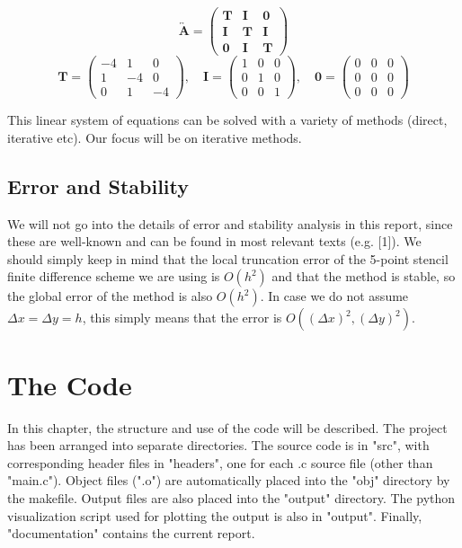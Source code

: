 \documentclass[11pt]{report}
\begin{document}
\begin{equation}
\overleftrightarrow{\textbf{A}} = 
\begin{pmatrix}
\bm{T} & \bm{I} & \bm{0} \\
\bm{I} & \bm{T} & \bm{I} \\
\bm{0} & \bm{I} & \bm{T}
\end{pmatrix}
\end{equation}
\vspace{0.5cm}
\begin{equation}
\bm{T} =
\begin{pmatrix}
-4 & 1 & 0 \\
1 & -4 & 0 \\
0 & 1 & -4
\end{pmatrix}
, \quad
\bm{I} =
\begin{pmatrix}
1 & 0 & 0 \\
0 & 1 & 0 \\
0 & 0 & 1
\end{pmatrix}
, \quad
\bm{0} =
\begin{pmatrix}
0 & 0 & 0 \\
0 & 0 & 0 \\
0 & 0 & 0
\end{pmatrix}
\end{equation}

\vspace{0.5cm}

This linear system of equations can be solved with a variety of methods (direct, iterative etc). Our focus will be on iterative methods.

\section{Error and Stability}
We will not go into the details of error and stability analysis in this report, since these are well-known 
and can be found in most relevant texts (e.g. [1]). We should simply keep in mind that the local truncation error of the 5-point stencil finite difference scheme we are using is $O(h^2)$ and that the method is stable, so the global error of the method is also $O(h^2)$. In case we do not assume $\Delta x = \Delta y = h$, this 
simply means that the error is $O((\Delta x)^2, (\Delta y)^2)$.

\chapter{The Code}
In this chapter, the structure and use of the code will be described. The project has been arranged into 
separate directories. The source code is in "src", with corresponding header files in "headers", one for each 
.c source file (other than "main.c"). Object files (".o") are automatically placed into the "obj" directory by the makefile. Output files are also placed into the "output" directory. The python visualization script used 
for plotting the output is also in "output". Finally, "documentation" contains the current report.
\end{document}
